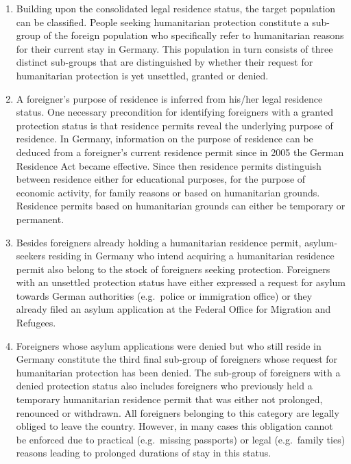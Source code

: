 \documentclass[
]{article}
\begin{document}
\begin{enumerate}
\def\labelenumi{\arabic{enumi}.}
\setcounter{enumi}{375}
\item
  Building upon the consolidated legal residence status, the target
  population can be classified. People seeking humanitarian protection
  constitute a sub-group of the foreign population who specifically
  refer to humanitarian reasons for their current stay in Germany.
  This population in turn consists of three distinct sub-groups that
  are distinguished by whether their request for humanitarian
  protection is yet unsettled, granted or denied.
\item
  A foreigner's purpose of residence is inferred from his/her legal
  residence status. One necessary precondition for identifying
  foreigners with a granted protection status is that residence
  permits reveal the underlying purpose of residence. In Germany,
  information on the purpose of residence can be deduced from a
  foreigner's current residence permit since in 2005 the German
  Residence Act became effective. Since then residence permits
  distinguish between residence either for educational purposes, for
  the purpose of economic activity, for family reasons or based on
  humanitarian grounds. Residence permits based on humanitarian
  grounds can either be temporary or permanent.
\item
  Besides foreigners already holding a humanitarian residence permit,
  asylum-seekers residing in Germany who intend acquiring a
  humanitarian residence permit also belong to the stock of foreigners
  seeking protection. Foreigners with an unsettled protection status
  have either expressed a request for asylum towards German
  authorities (e.g.~police or immigration office) or they already
  filed an asylum application at the Federal Office for Migration and
  Refugees.
\item
  Foreigners whose asylum applications were denied but who still
  reside in Germany constitute the third final sub-group of foreigners
  whose request for humanitarian protection has been denied. The
  sub-group of foreigners with a denied protection status also
  includes foreigners who previously held a temporary humanitarian
  residence permit that was either not prolonged, renounced or
  withdrawn. All foreigners belonging to this category are legally
  obliged to leave the country. However, in many cases this obligation
  cannot be enforced due to practical (e.g.~missing passports) or
  legal (e.g.~family ties) reasons leading to prolonged durations of
  stay in this status.
\end{enumerate}
\end{document}

